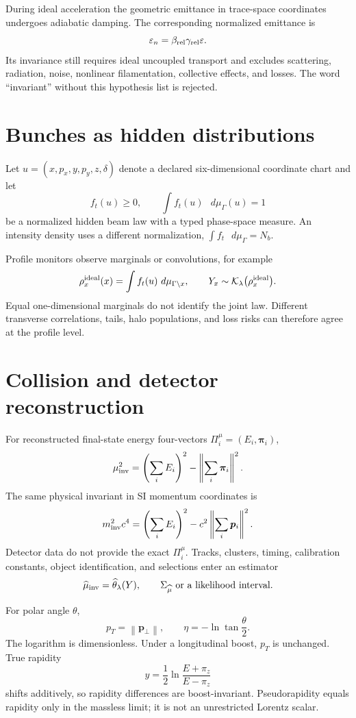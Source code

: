 \documentclass[11pt,a4paper]{article}
\theoremstyle{definition}
\theoremstyle{plain}
\theoremstyle{remark}
\newcommand{\dd}{\mathop{}\!d}
\newcommand{\norm}[1]{\left\lVert #1\right\rVert}
\newcommand{\Kcal}{\mathcal K}
\begin{document}
During ideal acceleration the geometric emittance in trace-space
coordinates undergoes adiabatic damping. The corresponding normalized
emittance is
\[
\varepsilon_n=\beta_{\rm rel}\gamma_{\rm rel}\varepsilon.
\]
Its invariance still requires ideal uncoupled transport and excludes
scattering, radiation, noise, nonlinear filamentation, collective
effects, and losses. The word ``invariant'' without this hypothesis
list is rejected.

\section{Bunches as hidden distributions}

Let \(u=(x,p_x,y,p_y,z,\delta)\) denote a declared six-dimensional
coordinate chart and let
\[
f_t(u)\ge0,\qquad
\int f_t(u)\,\dd\mu_\Gamma(u)=1
\]
be a normalized hidden beam law with a typed phase-space measure.
An intensity density uses a different normalization,
\(\int f_t\,\dd\mu_\Gamma=N_b\).

Profile monitors observe marginals or convolutions, for example
\[
\rho_x^{\rm ideal}(x)
=\int f_t(u)\,\dd\mu_{\Gamma\setminus x},
\qquad
Y_x\sim\Kcal_\lambda\bigl(\rho_x^{\rm ideal}\bigr).
\]
Equal one-dimensional marginals do not identify the joint law.
Different transverse correlations, tails, halo populations, and
loss risks can therefore agree at the profile level.

\section{Collision and detector reconstruction}

For reconstructed final-state energy four-vectors
\(\Pi_i^\mu=(E_i,\bm\pi_i)\),
\[
\mu_{\rm inv}^2
=
\left(\sum_iE_i\right)^2
-\left\lVert\sum_i\bm\pi_i\right\rVert^2.
\]
The same physical invariant in SI momentum coordinates is
\[
m_{\rm inv}^2c^4
=
\left(\sum_iE_i\right)^2
-c^2\left\lVert\sum_i\bm p_i\right\rVert^2.
\]
Detector data do not provide the exact \(\Pi_i^\mu\). Tracks, clusters,
timing, calibration constants, object identification, and selections
enter an estimator
\[
\widehat\mu_{\rm inv}
=\widehat\theta_\lambda(Y),\qquad
\Sigma_{\widehat\mu}
\ \text{or a likelihood interval}.
\]

For polar angle \(\theta\),
\[
p_T=\norm{\bm p_\perp},\qquad
\eta=-\ln\tan\frac{\theta}{2}.
\]
The logarithm is dimensionless. Under a longitudinal boost, \(p_T\)
is unchanged. True rapidity
\[
y=\frac12\ln\frac{E+\pi_z}{E-\pi_z}
\]
shifts additively, so rapidity differences are boost-invariant.
Pseudorapidity equals rapidity only in the massless limit; it is not
an unrestricted Lorentz scalar.
\end{document}
